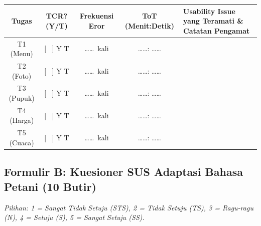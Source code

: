 \documentclass[11pt,a4paper]{article}
\begin{document}
\vspace{0.2cm}
\begin{table}[htbp]
\centering
\small
\begin{tabularx}{\textwidth}{c c c c X}
\toprule
\textbf{Tugas} & \textbf{TCR? (Y/T)} & \textbf{Frekuensi Eror} & \textbf{ToT (Menit:Detik)} & \textbf{Usability Issue yang Teramati \& Catatan Pengamat} \\
\midrule
T1 (Menu)  & [ \ ] Y \quad [ \ ] T & \dots\dots\ kali & \dots\dots : \dots\dots & \\[0.2cm]
T2 (Foto)  & [ \ ] Y \quad [ \ ] T & \dots\dots\ kali & \dots\dots : \dots\dots & \\[0.2cm]
T3 (Pupuk) & [ \ ] Y \quad [ \ ] T & \dots\dots\ kali & \dots\dots : \dots\dots & \\[0.2cm]
T4 (Harga) & [ \ ] Y \quad [ \ ] T & \dots\dots\ kali & \dots\dots : \dots\dots & \\[0.2cm]
T5 (Cuaca) & [ \ ] Y \quad [ \ ] T & \dots\dots\ kali & \dots\dots : \dots\dots & \\
\bottomrule
\end{tabularx}
\end{table}

\subsection{Formulir B: Kuesioner SUS Adaptasi Bahasa Petani (10 Butir)}
\noindent
\textit{Pilihan: 1 = Sangat Tidak Setuju (STS), 2 = Tidak Setuju (TS), 3 = Ragu-ragu (N), 4 = Setuju (S), 5 = Sangat Setuju (SS).}
\end{document}
